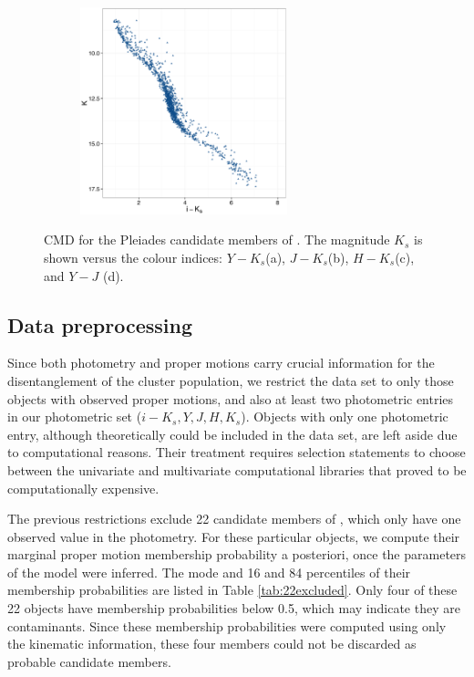 \begin{figure}[ht!]
\begin{subfigure}[t]{0.45\textwidth}
      \includegraphics[page=5,height=6cm]{background/Figures/CIs.pdf}
        \caption{}
        \label{} 
    \end{subfigure}
    \caption{CMD for the Pleiades candidate members of \citet{Bouy2015}. The magnitude $K_s$ is shown versus the colour indices: $Y-K_s$(a), $J-K_s$(b), $H-K_s$(c), and $Y-J$ (d).}
    \label{fig:otherCI}
\end{figure}


\subsection{Data preprocessing}
\label{sect:RDR2}
Since both photometry and proper motions carry crucial information for the disentanglement of the cluster population, we restrict the data set to only those objects with observed proper motions, and also at least two photometric entries in our photometric set ($i-K_s,Y,J,H,K_s$). {Objects with only one photometric entry, although theoretically could be included in the data set, are left aside due to computational reasons. Their treatment requires selection statements to choose between the univariate and multivariate computational libraries that proved to be computationally expensive.}

The previous restrictions exclude 22 candidate members of \citet{Bouy2015}, which only have one observed value in the photometry. For these particular objects, we compute their marginal proper motion membership probability a posteriori, once the parameters of the model were inferred. The mode and 16 and 84 percentiles of their membership probabilities are listed in Table \ref{tab:22excluded}. Only four of these 22 objects have membership probabilities below 0.5, which may indicate they are contaminants. Since these membership probabilities were computed using only the kinematic information, these four members could not be discarded as probable candidate members.

